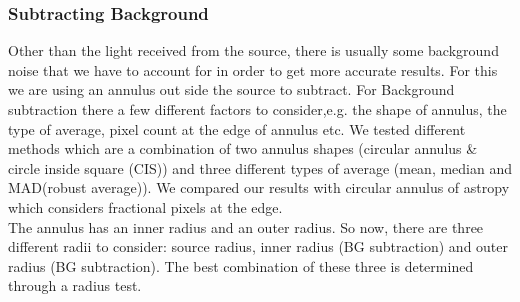 \documentclass{aastex6}
\begin{document}
        
        \subsubsection{Subtracting Background}
        Other than the light received from the source, there is usually some background noise that we have to account for in order to get more accurate results. For this we are using an annulus out side the source to subtract. For Background subtraction there a few different factors to consider,e.g. the shape of annulus, the type of average, pixel count at the edge of annulus etc. We tested different methods which are a combination of two annulus shapes (circular annulus \& circle inside square (CIS)) and three different types of average (mean, median and MAD(robust average)). We compared our results with circular annulus of astropy which considers fractional pixels at the edge. \\
        
        The annulus has an inner radius and an outer radius. So now, there are three different radii to consider: source radius, inner radius (BG subtraction) and outer radius (BG subtraction). The best combination of these three is determined through a radius test. \\
        
\end{document}
